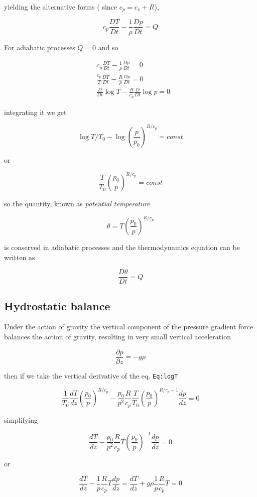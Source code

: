 yielding the alternative forms ( since \(c_p = c_v +R\)),

\[c_p\frac{D T}{Dt}  - \frac{1}{\rho}\frac{D p}{Dt} = Q\]

For adiabatic processes \(Q=0\) and so

\[\begin{aligned}
&c_p\frac{D T}{Dt}  - \frac{1}{\rho}\frac{D p}{Dt} = 0\\
&\frac{c_p}{T}\frac{D T}{Dt} -\frac{R}{p}\frac{D p}{Dt} = 0\\
&\frac{D }{Dt}\log{T} - \frac{R}{c_p}\frac{D }{Dt}\log{p} = 0
\end{aligned}\]

integrating it we get

\[\log{T/T_0} - \log{\left(\frac{p}{p_0}\right)^{R/c_p}} = const\]

or

\[\frac{T}{T_0}\left(\frac{p_0}{p}\right)^{R/c_p} = const\]

so the quantity, known as \emph{potential temperature}

\[\theta = T\left(\frac{p_0}{p}\right)^{R/c_p}\]

is conserved in adiabatic processes and the thermodynamics equation can
be written as

\[\frac{D \theta}{Dt} = Q\]

\subsection{Hydrostatic balance}\label{hydrostatic-balance}

Under the action of gravity the vertical component of the pressure
gradient force balances the action of gravity, resulting in very small
vertical acceleration

\[\frac{\partial p}{\partial z} =  -g \rho\]

then if we take the vertical derivative of the eq. \texttt{Eq:logT}

\[\frac{1}{T_0}\frac{d T}{dz}\left(\frac{p_0}{p}\right)^{R/c_p} -\frac{p_0}{p^2}\frac{R}{c_p}\frac{T}{T_0}\left(\frac{p_0}{p}\right)^{R/c_p-1}\frac{d p}{dz} = 0\]

simplifying

\[\frac{d T}{dz} -\frac{p_0}{p^2}\frac{R}{c_p}T\left(\frac{p_0}{p}\right)^{-1}\frac{d p}{dz} = 0\]

or

\[\frac{d T}{dz} -\frac{1}{p}\frac{R}{c_p}T\frac{d p}{dz} = \frac{d T}{dz} +g\rho\frac{1}{p}\frac{R}{c_p}T = 0\]

